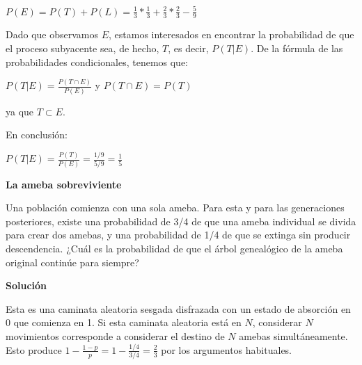 $P(E)=P(T)+P(L)=\frac{1}{3}*\frac{1}{3}+\frac{2}{3}*\frac{2}{3}-\frac{5}{9}$

Dado que observamos $E$, estamos interesados en encontrar la probabilidad de que
el proceso subyacente sea, de hecho, $T$, es decir, $P(T|E)$. De la fórmula de las
probabilidades condicionales, tenemos que:

$P(T|E)=\frac{P(T \cap E)}{P(E)}$  y $P(T \cap E) = P(T)$

ya que $T \subset E$.

En conclusión:

$P(T|E) = \frac{P(T)}{P(E)} = \frac{1/9}{5/9} = \frac{1}{5}$

\textbf{La ameba sobreviviente}

Una población comienza con una sola ameba. Para esta y para las generaciones
posteriores, existe una probabilidad de 3/4 de que una ameba individual se
divida para crear dos amebas, y una probabilidad de 1/4 de que se extinga sin
producir descendencia. ¿Cuál es la probabilidad de que el árbol genealógico de
la ameba original continúe para siempre?

\textbf{Solución}

Esta es una caminata aleatoria sesgada disfrazada con un estado de absorción en
0 que comienza en 1. Si esta caminata aleatoria está en $N$, considerar $N$
movimientos corresponde a considerar el destino de $N$ amebas simultáneamente.
Esto produce $1-\frac{1-p}{p}=1-\frac{1/4}{3/4}=\frac{2}{3}$ por los argumentos
habituales.

%
%



